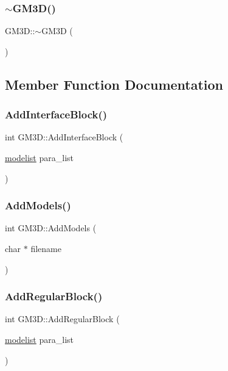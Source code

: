 \subsubsection{\texorpdfstring{$\sim$GM3D()}{~GM3D()}}
{\footnotesize\ttfamily G\+M3\+D\+::$\sim$\+G\+M3D (\begin{DoxyParamCaption}{ }\end{DoxyParamCaption})\hspace{0.3cm}{\ttfamily [inline]}}



\subsection{Member Function Documentation}
\mbox{\label{class_g_m3_d_a2d90d9301112d0c6d64f6ed862b3bdc1}} 
\subsubsection{\texorpdfstring{AddInterfaceBlock()}{AddInterfaceBlock()}}
{\footnotesize\ttfamily int G\+M3\+D\+::\+Add\+Interface\+Block (\begin{DoxyParamCaption}\item[{\mbox{\hyperlink{structmodelist}{modelist}}}]{para\+\_\+list }\end{DoxyParamCaption})}

\mbox{\label{class_g_m3_d_ab398f974da9ae5f066c64457a6eb9f10}} 
\subsubsection{\texorpdfstring{AddModels()}{AddModels()}}
{\footnotesize\ttfamily int G\+M3\+D\+::\+Add\+Models (\begin{DoxyParamCaption}\item[{char $\ast$}]{filename }\end{DoxyParamCaption})}

\mbox{\label{class_g_m3_d_afc8de602a16eee397f0e890ffe5eea7b}} 
\subsubsection{\texorpdfstring{AddRegularBlock()}{AddRegularBlock()}}
{\footnotesize\ttfamily int G\+M3\+D\+::\+Add\+Regular\+Block (\begin{DoxyParamCaption}\item[{\mbox{\hyperlink{structmodelist}{modelist}}}]{para\+\_\+list }\end{DoxyParamCaption})}


